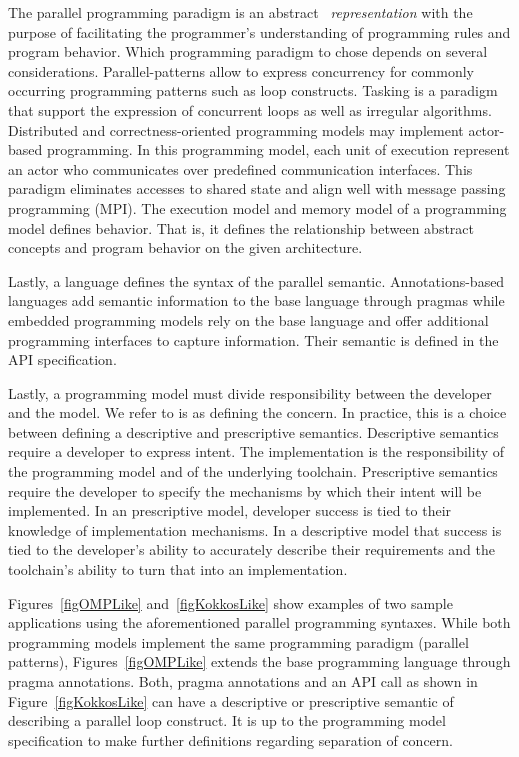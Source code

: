 The parallel programming paradigm is an abstract ~\emph{representation} with the purpose of facilitating the programmer's understanding of programming rules and program behavior. Which programming paradigm to chose depends on several considerations. Parallel-patterns allow to express concurrency for commonly occurring programming patterns such as loop constructs. Tasking is a paradigm that support the expression of concurrent loops as well as irregular algorithms. Distributed and correctness-oriented programming models may implement actor-based programming. In this programming model, each unit of execution represent an actor who communicates over predefined communication interfaces. This paradigm eliminates accesses to shared state and align well with message passing programming (MPI). The execution model and memory model of a programming model defines behavior. That is, it defines the relationship between abstract concepts and program behavior on the given architecture.

Lastly, a language defines the syntax of the parallel semantic. Annotations-based  languages add semantic information to the base language through pragmas while embedded programming models rely on the base language and offer additional programming interfaces to capture information. Their semantic is defined in the API specification. 

Lastly, a programming model must divide responsibility between the developer and the model. We refer to is as defining the concern. In practice, this is a choice between defining a descriptive and prescriptive semantics. Descriptive semantics require a developer to express intent. The implementation is the responsibility of the programming model and of the underlying toolchain. Prescriptive semantics require the developer to specify the mechanisms by which their intent will be implemented. In an prescriptive model, developer success is tied to their knowledge of implementation mechanisms. In a descriptive model that success is tied to the developer's ability to accurately describe their requirements and the toolchain's ability to turn that into an implementation. 

Figures~\ref{figOMPLike} and~\ref{figKokkosLike} show examples of two sample applications using the aforementioned parallel programming syntaxes. While both programming models implement the same programming paradigm (parallel patterns), Figures~\ref{figOMPLike} extends the base programming language through pragma annotations. Both, pragma annotations and an API call as shown in Figure~\ref{figKokkosLike} can have a descriptive or prescriptive semantic of describing a parallel loop construct. It is up to the programming model specification to make further definitions regarding separation of concern.

